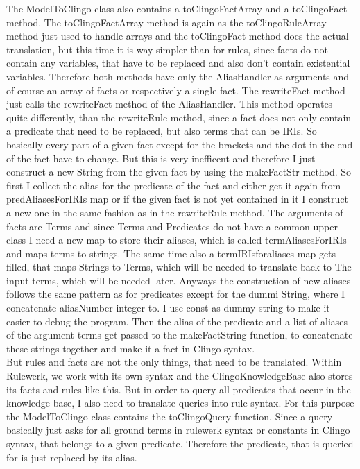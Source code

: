 \documentclass[hyperref, bachelorofscience]{cgvpub}
\begin{document}
The ModelToClingo class also contains a toClingoFactArray and a toClingoFact method. The toClingoFactArray method is again as the toClingoRuleArray method just used to handle arrays and the toClingoFact method does the actual translation, but this time it is way simpler than for rules, since facts do not contain any variables, that have to be replaced and also don't contain existential variables. Therefore both methods have only the AliasHandler as arguments and of course an array of facts or respectively a single fact.
The rewriteFact method just calls the rewriteFact method of the AliasHandler. This method operates quite differently, than the rewriteRule method, since a fact does not only contain a predicate that need to be replaced, but also terms that can be IRIs. So basically every part of a given fact except for the brackets and the dot in the end of the fact have to change. But this is very inefficent and therefore I just construct a new String from the given fact by using the makeFactStr method. So first I collect the alias for the predicate of the fact and either get it again from predAliasesForIRIs map or if the given fact is not yet contained in it I construct a new one in the same fashion as in the rewriteRule method. The arguments of facts are Terms and since Terms and Predicates do not have a common upper class I need a new map to store their aliases, which is called termAliasesForIRIs and maps terms to strings. The same time also a termIRIsforaliases map gets filled, that maps Strings to Terms, which will be needed to translate back to The input terms, which will be needed later. Anyways the construction of new aliases follows the same pattern as for predicates except for the dummi String, where I concatenate aliasNumber integer to. I use const as dummy string to make it easier to debug the program. Then the alias of the predicate and a list of aliases of the argument terms get passed to the makeFactString function, to concatenate these strings together and make it a fact in Clingo syntax. \\

But rules and facts are not the only things, that need to be translated. Within Rulewerk, we work with its own syntax and the ClingoKnowledgeBase also stores its facts and rules like this. But in order to query all predicates that occur in the knowledge base, I also need to translate queries into rule syntax. For this purpose the ModelToClingo class contains the toClingoQuery function. Since a query basically just asks for all ground terms in rulewerk syntax or constants in Clingo syntax, that belongs to a given predicate. Therefore the predicate, that is queried for is just replaced by its alias. \\
\end{document}

